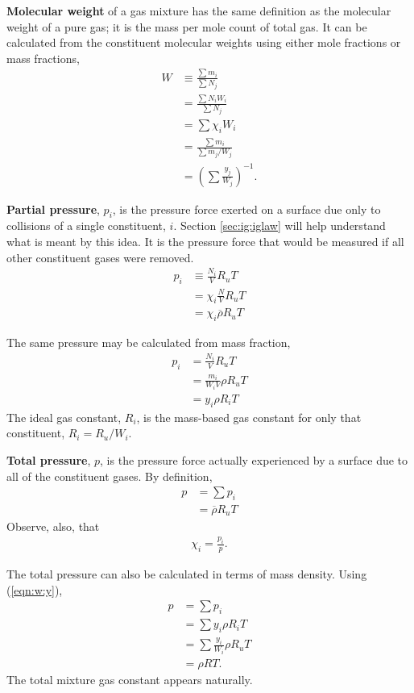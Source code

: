 {\bf Molecular weight} of a gas mixture has the same definition as the molecular weight of a pure gas; it is the mass per mole count of total gas.  It can be calculated from the constituent molecular weights using either mole fractions or mass fractions,
\begin{subequations}
\begin{align}
W &\equiv \frac{\sum m_i}{\sum N_j}\\
 &= \frac{\sum N_i W_i}{\sum N_j}\nonumber\\
 &= \sum \chi_i W_i\label{eqn:w:x}\\
 &= \frac{\sum m_i}{\sum m_j / W_j}\nonumber\\\
 &= \left(\sum \frac{y_j}{W_j} \right)^{-1}.\label{eqn:w:y}
\end{align}
\end{subequations}

{\bf Partial pressure}, $p_i$, is the pressure force exerted on a surface due only to collisions of a single constituent, $i$.  Section \ref{sec:ig:iglaw} will help understand what is meant by this idea.  It is the pressure force that would be measured if all other constituent gases were removed.  
\begin{align}
p_i &\equiv \frac{N_i}{V} R_u T \nonumber\\
 &= \chi_i \frac{N}{V} R_u T \nonumber\\
 &= \chi_i \overline{\rho} R_u T
\end{align}

The same pressure may be calculated from mass fraction,
\begin{align}
p_i &= \frac{N_i}{V} R_u T \nonumber\\
 &= \frac{m_i}{W_i V} \rho R_u T \nonumber\\
 &= y_i \rho R_i T
\end{align}
The ideal gas constant, $R_i$, is the mass-based gas constant for only that constituent, $R_i = R_u / W_i$.

{\bf Total pressure}, $p$, is the pressure force actually experienced by a surface due to all of the constituent gases.  By definition, 
\begin{align}
p &= \sum p_i \nonumber\\
 &= \overline{\rho} R_u T
\end{align}
Observe, also, that 
\begin{align}
\chi_i = \frac{p_i}{p}.
\end{align}

The total pressure can also be calculated in terms of mass density.  Using (\ref{eqn:w:y}),
\begin{align}
p &= \sum p_i \nonumber\\
 &= \sum y_i \rho R_i T\nonumber\\
 &= \sum \frac{y_i}{W_i} \rho R_u T\nonumber\\
 &= \rho R T.
\end{align}
The total mixture gas constant appears naturally.

